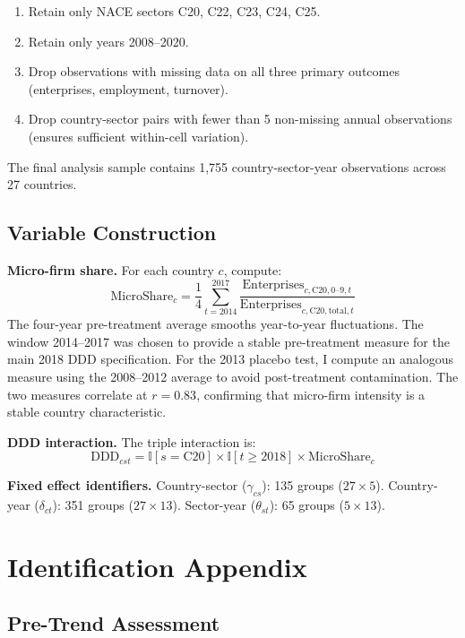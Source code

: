 \documentclass[12pt]{article}
\newcommand{\ind}{\mathbb{I}}
\begin{document}
\begin{enumerate}
\item Retain only NACE sectors C20, C22, C23, C24, C25.
\item Retain only years 2008--2020.
\item Drop observations with missing data on all three primary outcomes (enterprises, employment, turnover).
\item Drop country-sector pairs with fewer than 5 non-missing annual observations (ensures sufficient within-cell variation).
\end{enumerate}

The final analysis sample contains 1,755 country-sector-year observations across 27 countries.

\subsection{Variable Construction}

\textbf{Micro-firm share.} For each country $c$, compute:
\[
\text{MicroShare}_c = \frac{1}{4}\sum_{t=2014}^{2017} \frac{\text{Enterprises}_{c,\text{C20},\text{0--9},t}}{\text{Enterprises}_{c,\text{C20},\text{total},t}}
\]
The four-year pre-treatment average smooths year-to-year fluctuations. The window 2014--2017 was chosen to provide a stable pre-treatment measure for the main 2018 DDD specification. For the 2013 placebo test, I compute an analogous measure using the 2008--2012 average to avoid post-treatment contamination. The two measures correlate at $r = 0.83$, confirming that micro-firm intensity is a stable country characteristic.

\textbf{DDD interaction.} The triple interaction is:
\[
\text{DDD}_{cst} = \ind[s = \text{C20}] \times \ind[t \geq 2018] \times \text{MicroShare}_c
\]

\textbf{Fixed effect identifiers.} Country-sector ($\gamma_{cs}$): 135 groups ($27 \times 5$). Country-year ($\delta_{ct}$): 351 groups ($27 \times 13$). Sector-year ($\theta_{st}$): 65 groups ($5 \times 13$).


\section{Identification Appendix}
\label{sec:app_id}

\subsection{Pre-Trend Assessment}
\end{document}

